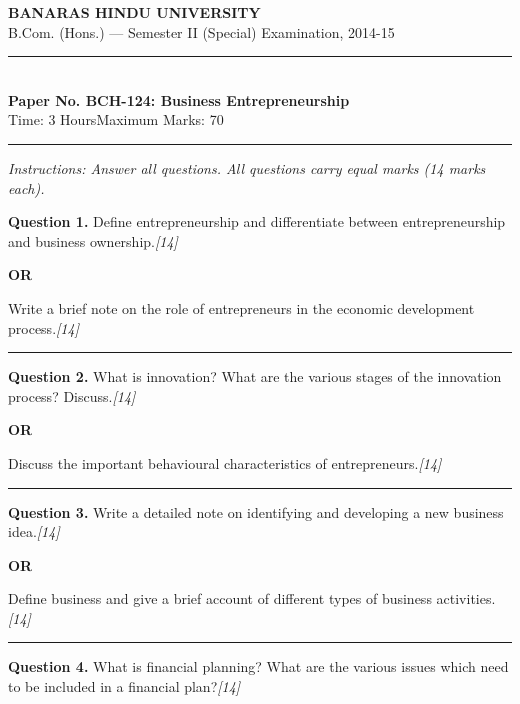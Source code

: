 \documentclass[11pt,a4paper]{article}
\newcommand{\pts}[1]{\hfill   \textit{[#1]}}
\begin{document}
\begin{center}
  {\large\bfseries BANARAS HINDU UNIVERSITY}\\[2pt]
  {\normalsize B.Com. (Hons.) --- Semester II (Special) Examination, 2014-15}\\[6pt]
  \rule{0.8\linewidth}{0.5pt}\\[6pt]
  {\large\bfseries Paper No. BCH-124: Business Entrepreneurship}\\[4pt]
  {\normalsize Time: 3 Hours\hfill Maximum Marks: 70}
\end{center}

\rule{\linewidth}{0.4pt}

\smallskip



\noindent   \textit{Instructions: Answer all questions. All questions carry equal marks (14 marks each).}

\bigskip




\noindent   \textbf{Question 1.}
Define entrepreneurship and differentiate between entrepreneurship and business ownership.\pts{14}

\centerline{   \textbf{OR}}

Write a brief note on the role of entrepreneurs in the economic development process.\pts{14}

\medskip\rule{\linewidth}{0.2pt}




\noindent   \textbf{Question 2.}
What is innovation? What are the various stages of the innovation process? Discuss.\pts{14}

\centerline{   \textbf{OR}}

Discuss the important behavioural characteristics of entrepreneurs.\pts{14}

\medskip\rule{\linewidth}{0.2pt}




\noindent   \textbf{Question 3.}
Write a detailed note on identifying and developing a new business idea.\pts{14}

\centerline{   \textbf{OR}}

Define business and give a brief account of different types of business activities.\pts{14}

\medskip\rule{\linewidth}{0.2pt}




\noindent   \textbf{Question 4.}
What is financial planning? What are the various issues which need to be included in a financial plan?\pts{14}
\end{document}
